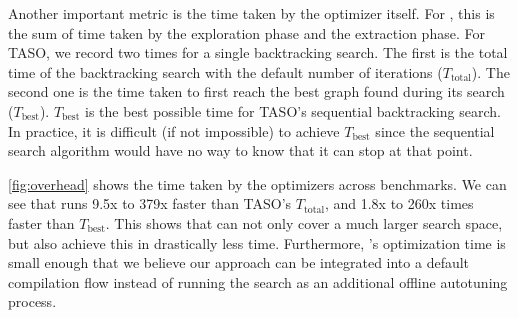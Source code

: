 Another important metric is the time taken by the optimizer itself.
For \ourname{}, this is the sum of time taken by the exploration phase and the extraction phase.
For TASO, we record two times for a single backtracking search.
The first is the total time of the backtracking search with the default number of iterations ($T_{\textrm{total}}$).
The second one is the time taken to first reach the best graph found during its search ($T_{\textrm{best}}$).
$T_{\textrm{best}}$ is the best possible time for TASO's sequential backtracking search.
In practice, it is difficult (if not impossible) to achieve $T_{\textrm{best}}$ since the sequential search algorithm would have no way to know that it can stop at that point.

\autoref{fig:overhead} shows the time taken by the optimizers across benchmarks.
We can see that \ourname{} runs 9.5x to 379x faster than TASO's $T_{\textrm{total}}$, and 1.8x to 260x times faster than $T_{\textrm{best}}$.
This shows that \ourname{} can not only cover a much larger search space, but also achieve this in drastically less time.
Furthermore, \ourname{}'s optimization time is small enough that we believe our approach can be integrated into a default compilation flow instead of running the search as an additional offline autotuning process.




